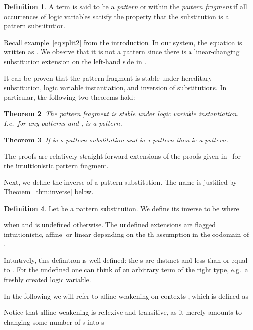 \documentclass{eptcs}
\newtheorem{thm}{Theorem}[section]
\theoremstyle{definition}
\newtheorem{defin}[thm]{Definition}
\begin{document}
\begin{defin}
A term  is said to be a \emph{pattern} or within the
\emph{pattern fragment} if all
occurrences of logic variables  satisfy the property that
the substitution  is a pattern substitution.
\end{defin}

Recall example~\eqref{eq:split2} from the introduction.  In our system,
the equation is written as
.
We observe that it is not a pattern since there is a linear-changing substitution
extension on the left-hand side in .

It can be proven that the pattern fragment is stable under hereditary
substitution, logic variable instantiation, and inversion of
substitutions.  In particular, the following two theorems hold:

\begin{thm}
The pattern fragment is stable under logic variable instantiation.
I.e.\ for any patterns  and ,  is a pattern.
\end{thm}

\begin{thm}
If  is a pattern substitution and  is a
pattern then  is a pattern.
\end{thm}

The proofs are relatively straight-forward extensions of the proofs given
in~\cite{Dowek98tr} for the intuitionistic pattern fragment.

Next, we define the inverse of a pattern substitution. The name is
justified by Theorem~\ref{thm:inverse} below.
\begin{defin}
Let  be a pattern substitution.
We define its inverse to be
 where

when  and  is undefined otherwise.
The undefined extensions  are flagged  intuitionistic,
affine, or linear depending on the th assumption in the codomain
of .
\end{defin}
Intuitively, this definition is well defined: the s are
distinct and less than or equal to .  For the undefined  one can think
of an arbitrary term of the right type, e.g.\ a freshly created logic variable.




In the following we will refer to affine weakening on contexts , which is defined as

Notice that affine weakening is reflexive and transitive, as it merely
amounts to changing some number of s into s.
\end{document}
